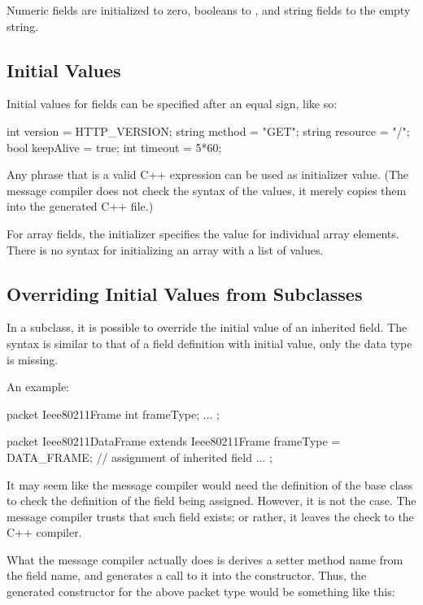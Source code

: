 Numeric fields are initialized to zero, booleans to , and string
fields to the empty string.


\subsection{Initial Values}
\label{sec:msg-defs:initial-values}

Initial values for fields can be specified after an equal sign, like so:

\begin{msg}
int version = HTTP_VERSION;
string method = "GET";
string resource = "/";
bool keepAlive = true;
int timeout = 5*60;
\end{msg}

Any phrase that is a valid C++ expression can be used as initializer value. (The
message compiler does not check the syntax of the values, it merely copies them
into the generated C++ file.)

For array fields, the initializer specifies the value for individual array
elements. There is no syntax for initializing an array with a list of values.


\subsection{Overriding Initial Values from Subclasses}
\label{sec:msg-defs:assignment-of-inherited-fields}

In a subclass, it is possible to override the initial value of an inherited
field. The syntax is similar to that of a field definition with initial value,
only the data type is missing.

An example:

\begin{msg}
packet Ieee80211Frame
{
    int frameType;
    ...
};

packet Ieee80211DataFrame extends Ieee80211Frame
{
    frameType = DATA_FRAME;  // assignment of inherited field
    ...
};
\end{msg}

It may seem like the message compiler would need the definition of the base
class to check the definition of the field being assigned. However, it is
not the case. The message compiler trusts that such field exists; or
rather, it leaves the check to the C++ compiler.

What the message compiler actually does is derives a setter method name
from the field name, and generates a call to it into the constructor.
Thus, the generated constructor for the above packet type would be
something like this:

